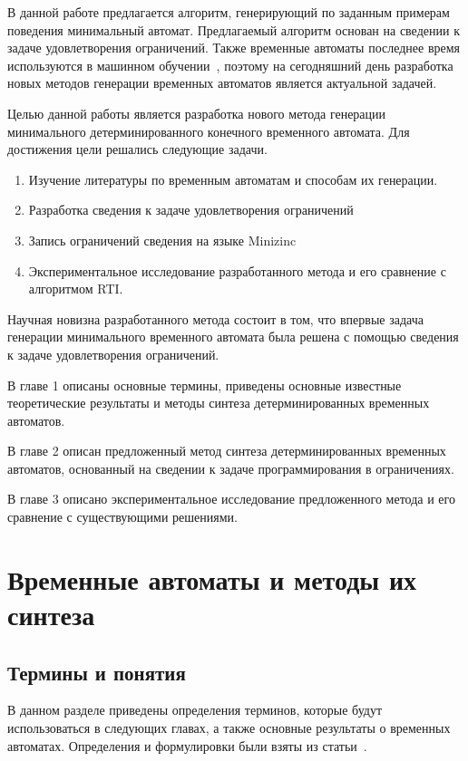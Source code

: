 \documentclass[times,specification,annotation]{itmo-student-thesis}
\begin{document}
В данной работе предлагается алгоритм, генерирующий по заданным примерам поведения минимальный автомат. 
Предлагаемый алгоритм основан на сведении к задаче удовлетворения ограничений.
Также временные автоматы последнее время используются в машинном обучении~\cite{moha}, 
поэтому на сегодняшний день разработка новых методов генерации временных автоматов является актуальной задачей. 

Целью данной работы является разработка нового метода генерации минимального детерминированного конечного временного автомата. Для достижения цели решались следующие задачи.
\begin{enumerate}
  \item Изучение литературы по временным автоматам и способам их генерации.
  \item Разработка сведения к задаче удовлетворения ограничений
  \item Запись ограничений сведения на языке Minizinc
  \item Экспериментальное исследование разработанного метода и его сравнение с алгоритмом RTI.
\end{enumerate}

Научная новизна разработанного метода состоит в том, что впервые задача генерации минимального временного автомата была решена с помощью сведения к задаче удовлетворения ограничений.

В главе 1 описаны основные термины, приведены основные известные теоретические результаты и методы синтеза детерминированных временных автоматов.

В главе 2 описан предложенный метод синтеза детерминированных временных автоматов, основанный на сведении к задаче программирования в ограничениях.

В главе 3 описано экспериментальное исследование предложенного метода и его сравнение с существующими решениями.

\startrelatedwork

\chapter{Временные автоматы и методы их синтеза}

\section{Термины и понятия}
В данном разделе приведены определения терминов, которые будут использоваться в следующих главах, а также основные результаты о временных автоматах.
Определения и формулировки были взяты из статьи~\cite{1-dta}.
\end{document}
